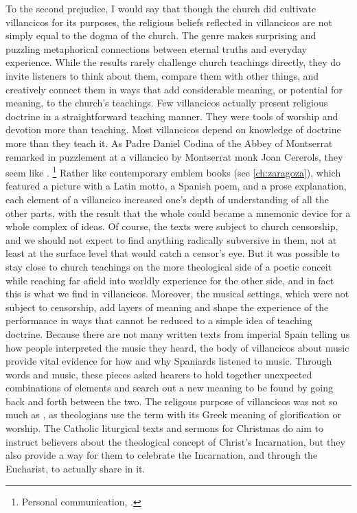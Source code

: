 To the second prejudice, I would say that though the church did cultivate
villancicos for its purposes, the religious beliefs reflected in villancicos
are not simply equal to the dogma of the church.
The genre makes surprising and puzzling metaphorical connections between
eternal truths and everyday experience.  
While the results rarely challenge church teachings directly, they do invite
listeners to think about them, compare them with other things, and creatively
connect them in ways that add considerable meaning, or potential for meaning,
to the church's teachings.
Few villancicos actually present religious doctrine in a straightforward
teaching manner.
They were tools of worship and devotion more than teaching.  
Most villancicos depend on knowledge of doctrine more than they teach it.
As Padre Daniel Codina of the Abbey of Montserrat remarked in puzzlement at a
villancico by Montserrat monk Joan Cererols, they seem like .%
    \footnote{Personal communication, \XXX[date].}
Rather like contemporary emblem books (see \cref{ch:zaragoza}), which featured
a picture with a Latin motto, a Spanish poem, and a prose explanation, each
element of a villancico increased one's depth of understanding of all the other
parts, with the result that the whole could became a mnemonic device for a
whole complex of ideas.
Of course, the texts were subject to church censorship, and we should not
expect to find anything radically subversive in them, not at least at the
surface level that would catch a censor's eye.
But it was possible to stay close to church teachings on the more theological
side of a poetic conceit while reaching far afield into worldly experience for
the other side, and in fact this is what we find in villancicos.
Moreover, the musical settings, which were not subject to censorship, add
layers of meaning and shape the experience of the performance in ways that
cannot be reduced to a simple idea of teaching doctrine.
Because there are not many written texts from imperial Spain telling us how
people interpreted the music they heard, the body of villancicos about music
provide vital evidence for how and why Spaniards listened to music.
Through words and music, these pieces asked hearers to hold together unexpected
combinations of elements and search out a new meaning to be found by going back
and forth between the two.
The religous purpose of villancicos was not so much  as
, as theologians use the term with its Greek meaning of
glorification or worship.%
The Catholic liturgical texts and sermons for Christmas do aim to instruct
believers about the theological concept of Christ's Incarnation, but they also
provide a way for them to celebrate the Incarnation, and through the Eucharist,
to actually share in it.


